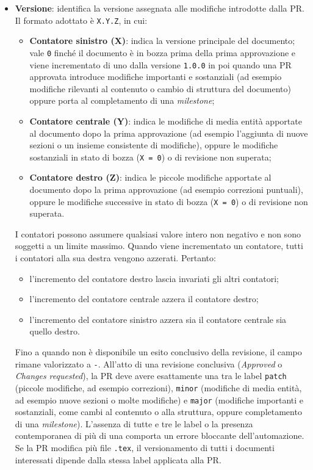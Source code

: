 \documentclass[11pt, a4paper]{article}
\begin{document}
\begin{itemize}
    \item \textbf{Versione}: identifica la versione assegnata alle modifiche introdotte dalla PR. Il formato adottato è \texttt{X.Y.Z}, in cui:
    \begin{itemize}
        \item \textbf{Contatore sinistro (X)}: indica la versione principale del documento; vale \texttt{0} finché il documento è in bozza prima della prima approvazione e viene incrementato di uno dalla versione \texttt{1.0.0} in poi quando una PR approvata introduce modifiche importanti e sostanziali (ad esempio modifiche rilevanti al contenuto o cambio di struttura del documento) oppure porta al completamento di una \textit{milestone};
        \item \textbf{Contatore centrale (Y)}: indica le modifiche di media entità apportate al documento dopo la prima approvazione (ad esempio l'aggiunta di nuove sezioni o un insieme consistente di modifiche), oppure le modifiche sostanziali in stato di bozza (\texttt{X = 0}) o di revisione non superata;
        \item \textbf{Contatore destro (Z)}: indica le piccole modifiche apportate al documento dopo la prima approvazione (ad esempio correzioni puntuali), oppure le modifiche successive in stato di bozza (\texttt{X = 0}) o di revisione non superata.
    \end{itemize}

    I contatori possono assumere qualsiasi valore intero non negativo e non sono soggetti a un limite massimo. Quando viene incrementato un contatore, tutti i contatori alla sua destra vengono azzerati. Pertanto:
    \begin{itemize}
        \item l'incremento del contatore destro lascia invariati gli altri contatori;
        \item l'incremento del contatore centrale azzera il contatore destro;
        \item l'incremento del contatore sinistro azzera sia il contatore centrale sia quello destro.
    \end{itemize}

    Fino a quando non è disponibile un esito conclusivo della revisione, il campo rimane valorizzato a \texttt{-}. All'atto di una revisione conclusiva (\textit{Approved} o \textit{Changes requested}), la PR deve avere esattamente una tra le label \texttt{patch} (piccole modifiche, ad esempio correzioni), \texttt{minor} (modifiche di media entità, ad esempio nuove sezioni o molte modifiche) e \texttt{major} (modifiche importanti e sostanziali, come cambi al contenuto o alla struttura, oppure completamento di una \textit{milestone}). L'assenza di tutte e tre le label o la presenza contemporanea di più di una comporta un errore bloccante dell'automazione. Se la PR modifica più file \texttt{.tex}, il versionamento di tutti i documenti interessati dipende dalla stessa label applicata alla PR.


\end{itemize}
\end{document}
